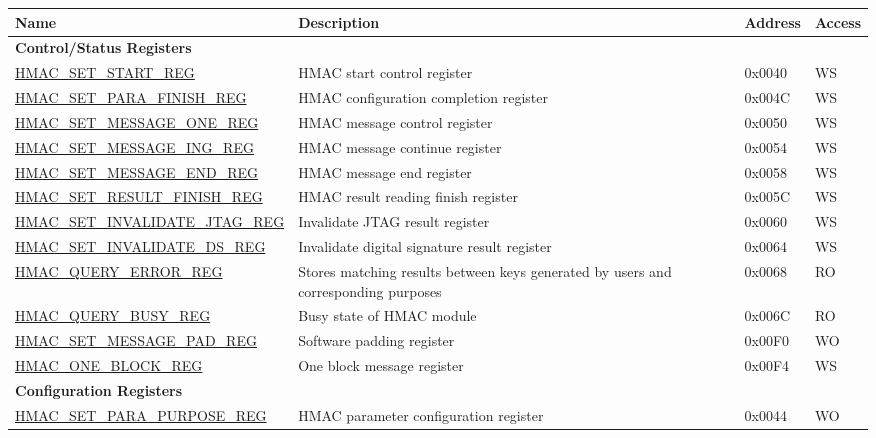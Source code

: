 \begin{longtable}{ | p{5.4cm} | p{5.8cm} | p{2cm} | p{1cm} | }
    \hline\rowcolor{lightgray}
    \textbf{Name} & \textbf{Description} & \textbf{Address} & \textbf{Access} \\ \hline
    \endhead
    \multicolumn{4}{|l|}{\textbf{Control/Status Registers}} \\ \hline
    \hyperref[regdesc:HMACSETSTARTREG]{HMAC\_SET\_START\_REG} & HMAC start control register & 0x0040 & WS \\ \hline
    \hyperref[regdesc:HMACSETPARAFINISHREG]{HMAC\_SET\_PARA\_FINISH\_REG} & HMAC configuration completion register & 0x004C & WS \\ \hline
    \hyperref[regdesc:HMACSETMESSAGEONEREG]{HMAC\_SET\_MESSAGE\_ONE\_REG} & HMAC message control register & 0x0050 & WS \\ \hline
    \hyperref[regdesc:HMACSETMESSAGEINGREG]{HMAC\_SET\_MESSAGE\_ING\_REG} & HMAC message continue register & 0x0054 & WS \\ \hline
    \hyperref[regdesc:HMACSETMESSAGEENDREG]{HMAC\_SET\_MESSAGE\_END\_REG} & HMAC message end register & 0x0058 & WS \\ \hline
    \hyperref[regdesc:HMACSETRESULTFINISHREG]{HMAC\_SET\_RESULT\_FINISH\_REG} & HMAC result reading finish register & 0x005C & WS \\ \hline
    \hyperref[regdesc:HMACSETINVALIDATEJTAGREG]{HMAC\_SET\_INVALIDATE\_JTAG\_REG} & Invalidate JTAG result register & 0x0060 & WS \\ \hline
    \hyperref[regdesc:HMACSETINVALIDATEDSREG]{HMAC\_SET\_INVALIDATE\_DS\_REG} & Invalidate digital signature result register & 0x0064 & WS \\ \hline
    \hyperref[regdesc:HMACQUERYERRORREG]{HMAC\_QUERY\_ERROR\_REG} & Stores matching results between keys generated by users and corresponding purposes & 0x0068 & RO \\ \hline
    \hyperref[regdesc:HMACQUERYBUSYREG]{HMAC\_QUERY\_BUSY\_REG} & Busy state of HMAC module & 0x006C & RO \\ \hline
    \hyperref[regdesc:HMACSETMESSAGEPADREG]{HMAC\_SET\_MESSAGE\_PAD\_REG} & Software padding register & 0x00F0 & WO \\ \hline
    \hyperref[regdesc:HMACONEBLOCKREG]{HMAC\_ONE\_BLOCK\_REG} & One block message register & 0x00F4 & WS \\ \hline
    \multicolumn{4}{|l|}{\textbf{Configuration Registers}} \\ \hline
    \hyperref[regdesc:HMACSETPARAPURPOSEREG]{HMAC\_SET\_PARA\_PURPOSE\_REG} & HMAC parameter configuration register & 0x0044 & WO \\ \hline

\end{longtable}
